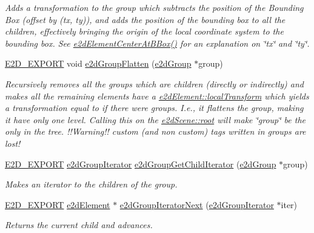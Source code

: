 \begin{DoxyCompactItemize}
\begin{DoxyCompactList}\small\item\em Adds a transformation to the group which subtracts the position of the Bounding Box (offset by (tx, ty)), and adds the position of the bounding box to all the children, effectively bringing the origin of the local coordinate system to the bounding box. See \hyperlink{group__e2dElement_gab829b280fa22a3509c40425fc84b5061}{e2d\-Element\-Center\-At\-B\-Box()} for an explanation on \char`\"{}tx\char`\"{} and \char`\"{}ty\char`\"{}. \end{DoxyCompactList}\item 
\hyperlink{Ez2DS_8h_a9f14e9cb869e1a85fdaba03afcca0df9}{E2\-D\-\_\-\-E\-X\-P\-O\-R\-T} void \hyperlink{group__e2dGroup_ga406ebab73c321b771a9a58e26c3a5d79}{e2d\-Group\-Flatten} (\hyperlink{structe2dGroup}{e2d\-Group} $\ast$group)
\begin{DoxyCompactList}\small\item\em Recursively removes all the groups which are children (directly or indirectly) and makes all the remaining elements have a \hyperlink{structe2dElement_a52bda732df714953f93c1e6f5f7c7c93}{e2d\-Element\-::local\-Transform} which yields a transformation equal to if there were groups. I.\-e., it flattens the group, making it have only one level. Calling this on the \hyperlink{structe2dScene_aa5444ac46bf18449921a4094bcadde1c}{e2d\-Scene\-::root} will make \char`\"{}group\char`\"{} be the only in the tree. !!\-Warning!! custom (and non custom) tags written in groups are lost! \end{DoxyCompactList}\item 
\hyperlink{Ez2DS_8h_a9f14e9cb869e1a85fdaba03afcca0df9}{E2\-D\-\_\-\-E\-X\-P\-O\-R\-T} \hyperlink{structe2dGroupIterator}{e2d\-Group\-Iterator} \hyperlink{group__e2dGroup_ga35b130caa1b107616881615e9c8fb9ad}{e2d\-Group\-Get\-Child\-Iterator} (\hyperlink{structe2dGroup}{e2d\-Group} $\ast$group)
\begin{DoxyCompactList}\small\item\em Makes an iterator to the children of the group. \end{DoxyCompactList}\item 
\hyperlink{Ez2DS_8h_a9f14e9cb869e1a85fdaba03afcca0df9}{E2\-D\-\_\-\-E\-X\-P\-O\-R\-T} \hyperlink{structe2dElement}{e2d\-Element} $\ast$ \hyperlink{group__e2dGroup_ga5a20617c4666d240ab6c0efdde72d23f}{e2d\-Group\-Iterator\-Next} (\hyperlink{structe2dGroupIterator}{e2d\-Group\-Iterator} $\ast$iter)
\begin{DoxyCompactList}\small\item\em Returns the current child and advances. \end{DoxyCompactList}\item 

\end{DoxyCompactItemize}
